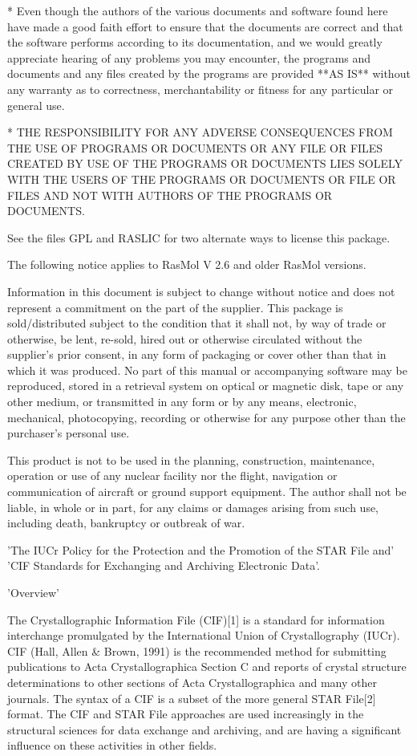 * Even though the authors of the various documents and software found here
have made a good faith effort to ensure that the documents are correct and
that the software performs according to its documentation, and we would
greatly appreciate hearing of any problems you may encounter, the programs
and documents and any files created by the programs are provided **AS IS**
without any warranty as to correctness, merchantability or fitness for any
particular or general use.

* THE RESPONSIBILITY FOR ANY ADVERSE CONSEQUENCES FROM THE USE OF PROGRAMS
OR DOCUMENTS OR ANY FILE OR FILES CREATED BY USE OF THE PROGRAMS OR
DOCUMENTS LIES SOLELY WITH THE USERS OF THE PROGRAMS OR DOCUMENTS OR FILE
OR FILES AND NOT WITH AUTHORS OF THE PROGRAMS OR DOCUMENTS.

See the files GPL and RASLIC for two alternate ways to license this
package.

The following notice applies to RasMol V 2.6 and older RasMol versions.

Information in this document is subject to change without notice and
does not represent a commitment on the part of the supplier. This package
is sold/distributed subject to the condition that it shall not, by way
of trade or otherwise, be lent, re-sold, hired out or otherwise
circulated without the supplier's prior consent, in any form of
packaging or cover other than that in which it was produced. No
part of this manual or accompanying software may be reproduced,
stored in a retrieval system on optical or magnetic disk, tape or
any other medium, or transmitted in any form or by any means,
electronic, mechanical, photocopying, recording or otherwise for
any purpose other than the purchaser's personal use.

This product is not to be used in the planning, construction,
maintenance, operation or use of any nuclear facility nor the
flight, navigation or communication of aircraft or ground support
equipment. The author shall not be liable, in whole or in part, for
any claims or damages arising from such use, including death,
bankruptcy or outbreak of war.

'The IUCr Policy for the Protection and the Promotion of the STAR File and'
'CIF Standards for Exchanging and Archiving Electronic Data'.

'Overview'

The Crystallographic Information File (CIF)[1] is a standard for information
interchange promulgated by the International Union of Crystallography
(IUCr). CIF (Hall, Allen & Brown, 1991) is the recommended method for
submitting publications to Acta Crystallographica Section C and reports of
crystal structure determinations to other sections of Acta Crystallographica
and many other journals. The syntax of a CIF is a subset of the more general
STAR File[2] format. The CIF and STAR File approaches are used increasingly
in the structural sciences for data exchange and archiving, and are having a
significant influence on these activities in other fields.

